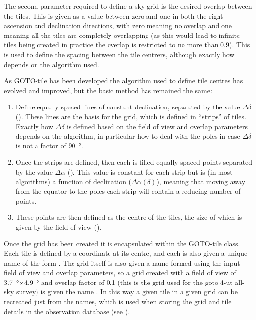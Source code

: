 \begin{colsection}
\begin{colsection}
The second parameter required to define a sky grid is the desired overlap between the tiles. This is given as a value between zero and one in both the right ascension and declination directions, with zero meaning no overlap and one meaning all the tiles are completely overlapping (as this would lead to infinite tiles being created in practice the overlap is restricted to no more than $0.9$). This is used to define the spacing between the tile centrers, although exactly how depends on the algorithm used.

As GOTO-tile has been developed the algorithm used to define tile centres has evolved and improved, but the basic method has remained the same:

\begin{enumerate}
    \item Define equally spaced lines of constant declination, separated by the value $\Delta\delta$ (). These lines are the basis for the grid, which is defined in ``strips'' of tiles. Exactly how $\Delta\delta$ is defined based on the field of view and overlap parameters depends on the algorithm, in particular how to deal with the poles in case $\Delta\delta$ is not a factor of \SI{90}{\degree}.
    \item Once the strips are defined, then each is filled equally spaced points separated by the value $\Delta\alpha$ (). This value is constant for each strip but is (in most algorithms) a function of declination ($\Delta\alpha(\delta)$), meaning that moving away from the equator to the poles each strip will contain a reducing number of points.
    \item These points are then defined as the centre of the tiles, the size of which is given by the field of view ().
\end{enumerate}

Once the grid has been created it is encapsulated within the GOTO-tile  class. Each tile is defined by a coordinate at its centre, and each is also given a unique name of the form . The grid itself is also given a name formed using the input field of view and overlap parameters, so a grid created with a field of view of \SI{3.7}{\degree}$\times$\SI{4.9}{\degree} and overlap factor of 0.1 (this is the grid used for the \gls{goto} 4-\gls{ut} all-sky survey) is given the name . In this way a given tile in a given grid can be recreated just from the names, which is used when storing the grid and tile details in the observation database (see ). %


\end{colsection}
\end{colsection}
